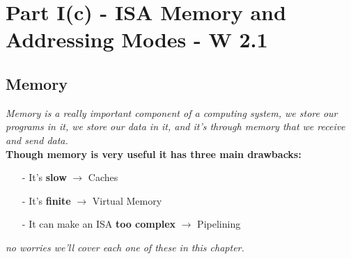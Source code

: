 \chapter{Part I(c) - ISA Memory and Addressing Modes - W 2.1}

\section{Memory}
\textit{Memory is a really important component of a computing system, we store our programs in it, we store our data in it, and it's through memory that we receive and send data.} \\ \vspace*{5px}
\textbf{Though memory is very useful it has three main drawbacks:} \\ \vspace*{5px}
\begin{itemize}
    \item[-] It's \textbf{slow} $\rightarrow$ Caches
    \item[-] It's \textbf{finite} $\rightarrow$ Virtual Memory
    \item[-] It can make an ISA \textbf{too complex} $\rightarrow$ Pipelining
\end{itemize}
\textit{no worries we'll cover each one of these in this chapter.}

